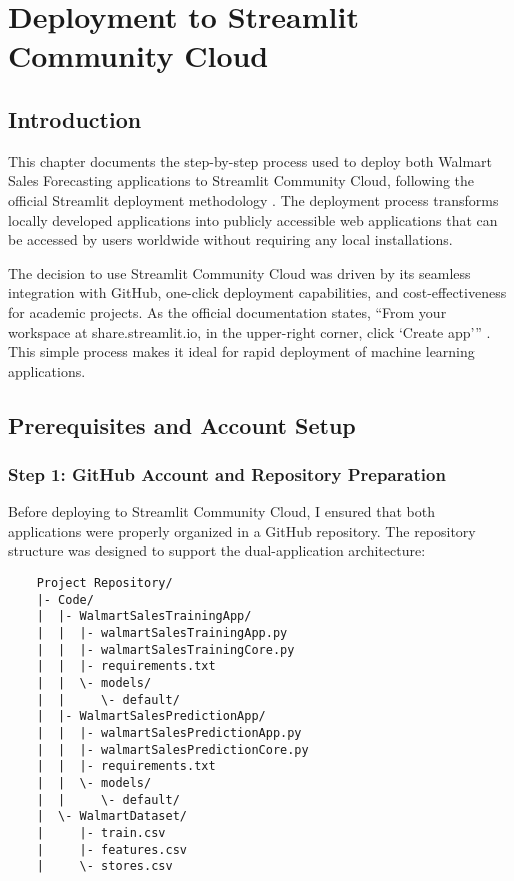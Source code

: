 %
%
%

\chapter{Deployment to Streamlit Community Cloud}

\section{Introduction}

This chapter documents the step-by-step process used to deploy both Walmart Sales Forecasting applications to Streamlit Community Cloud, following the official Streamlit deployment methodology \cite{StreamlitDeploy:2024}. The deployment process transforms locally developed applications into publicly accessible web applications that can be accessed by users worldwide without requiring any local installations.

The decision to use Streamlit Community Cloud was driven by its seamless integration with GitHub, one-click deployment capabilities, and cost-effectiveness for academic projects. As the official documentation states, ``From your workspace at share.streamlit.io, in the upper-right corner, click `Create app''' \cite{Streamlit:2024deploy}. This simple process makes it ideal for rapid deployment of machine learning applications.

\section{Prerequisites and Account Setup}

\subsection{Step 1: GitHub Account and Repository Preparation}

Before deploying to Streamlit Community Cloud, I ensured that both applications were properly organized in a GitHub repository. The repository structure was designed to support the dual-application architecture:

\begin{verbatim}
	Project Repository/
	|- Code/
	|  |- WalmartSalesTrainingApp/
	|  |  |- walmartSalesTrainingApp.py
	|  |  |- walmartSalesTrainingCore.py
	|  |  |- requirements.txt
	|  |  \- models/
	|  |     \- default/
	|  |- WalmartSalesPredictionApp/
	|  |  |- walmartSalesPredictionApp.py
	|  |  |- walmartSalesPredictionCore.py
	|  |  |- requirements.txt
	|  |  \- models/
	|  |     \- default/
	|  \- WalmartDataset/
	|     |- train.csv
	|     |- features.csv
	|     \- stores.csv
\end{verbatim}

